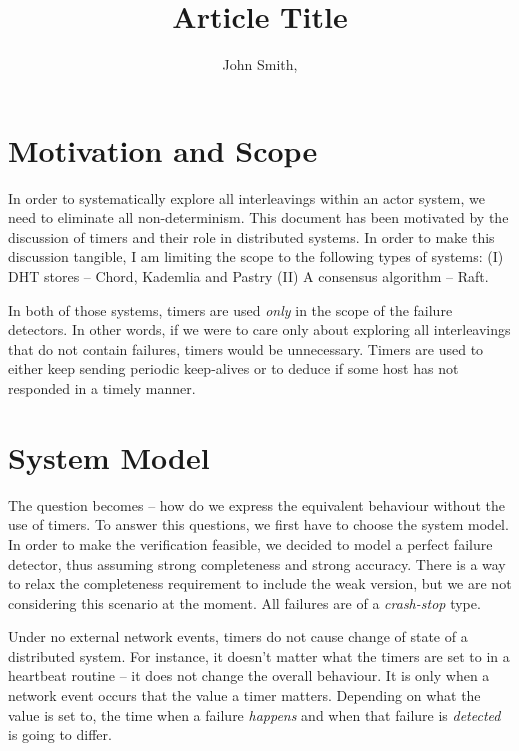 \documentclass[DIV=calc, paper=a4, fontsize=11pt, twocolumn]{scrartcl}   %
\title{Article Title} %
\author{John Smith, } %
\date{} %
\begin{document}

\thispagestyle{fancy} %

\section*{Motivation and Scope}

In order to systematically explore all interleavings within an actor system, we need to eliminate all non-determinism.  This document has been motivated by the discussion of timers and their role in distributed systems.  In order to make this discussion tangible, I am limiting the scope to the following types of systems: (I) DHT stores -- Chord, Kademlia and Pastry (II) A consensus algorithm -- Raft.

In both of those systems, timers are used {\em only} in the scope of the failure detectors. In other words, if we were to care only about exploring all interleavings that do not contain failures, timers would be unnecessary. Timers are used to either keep sending periodic keep-alives or to deduce if some host has not responded in a timely manner.

\section*{System Model}

The question becomes -- how do we express the equivalent behaviour without the use of timers.  To answer this questions, we first have to choose the system model. In order to make the verification feasible, we decided to model a perfect failure detector, thus assuming strong completeness and strong accuracy. There is a way to relax the completeness requirement to include the weak version, but we are not considering this scenario at the moment.  All failures are of a {\em crash-stop} type.

Under no external network events, timers do not cause change of state of a distributed system.  For instance, it doesn't matter what the timers are set to in a heartbeat routine -- it does not change the overall behaviour. It is only when a network event occurs that the value a timer matters. Depending on what the value is set to, the time when a failure {\em happens} and when that failure is {\em detected} is going to differ.
\end{document}
